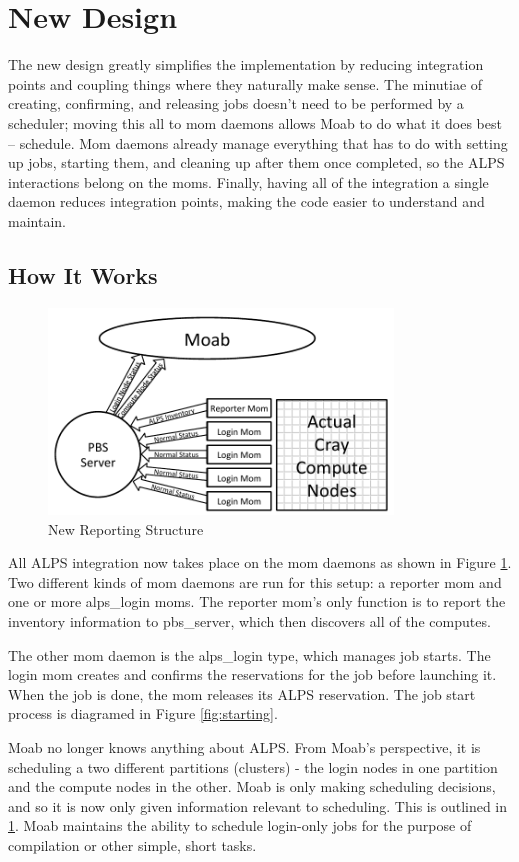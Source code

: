 \section{New Design}

The new design greatly simplifies the implementation by reducing integration
points and coupling things where they naturally make sense. The minutiae of
creating, confirming, and releasing jobs doesn't need to be performed by a
scheduler; moving this all to mom daemons allows Moab to do what it does best –
schedule. Mom daemons already manage everything that has to do with setting up
jobs, starting them, and cleaning up after them once completed, so the ALPS
interactions belong on the moms. Finally, having all of the integration a
single daemon reduces integration points, making the code easier to understand
and maintain.

\subsection{How It Works}
\begin{figure}
  \centering
  \includegraphics[width=3.6in]{figures/new-diagram.pdf}
  \caption{New Reporting Structure}\label{fig:reporting}
\end{figure}

All ALPS integration now takes place on the mom daemons as shown in Figure
\ref{fig:reporting}. Two different kinds of mom daemons are run for this setup:
a reporter mom and one or more alps_login moms. The reporter mom's only
function is to report the inventory information to pbs_server, which then
discovers all of the computes.

The other mom daemon is the alps_login type, which manages job starts. The
login mom creates and confirms the reservations for the job before launching
it. When the job is done, the mom releases its ALPS reservation. The job start
process is diagramed in Figure \ref{fig:starting}.

Moab no longer knows anything about ALPS. From Moab's perspective, it is
scheduling a two different partitions (clusters) - the login nodes in one
partition and the compute nodes in the other. Moab is only making scheduling
decisions, and so it is now only given information relevant to scheduling. This
is outlined in \ref{fig:reporting}. Moab maintains the ability to schedule
login-only jobs for the purpose of compilation or other simple, short tasks.

